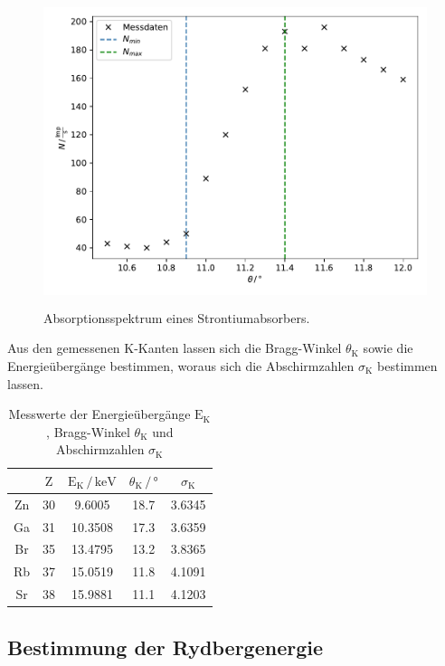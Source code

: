 \begin{figure}
    \centering
       \includegraphics[height=9cm]{daten/strontium.pdf}
       \caption{Absorptionsspektrum eines Strontiumabsorbers.}
       \label{fig:strontium}
\end{figure}

\noindent
Aus den gemessenen K-Kanten lassen sich die Bragg-Winkel $\theta_\text{K}$ sowie die Energieübergänge bestimmen,
woraus sich die Abschirmzahlen $\sigma_\text{K}$ bestimmen lassen.

\begin{table}
    \centering
    \caption{Messwerte der Energieübergänge $\text{E}_\text{K}$, Bragg-Winkel $\theta_\text{K}$ und Abschirmzahlen $\sigma_\text{K}$}
    \label{tab:mess3}
    \begin{tabular}{c c c c c}
    \toprule
         & $\text{Z}$ & $\text{E}_\text{K} \,/\, \mathrm{keV}$ & $\theta_\text{K} \,/\, ° $ & $\sigma_\text{K} $\\
    \midrule 
      Zn & 30 & 9.6005  & 18.7 & 3.6345 \\
      Ga & 31 & 10.3508 & 17.3 & 3.6359 \\
      Br & 35 & 13.4795 & 13.2 & 3.8365 \\
      Rb & 37 & 15.0519 & 11.8 & 4.1091 \\
      Sr & 38 & 15.9881 & 11.1 & 4.1203 \\
    \bottomrule
    \end{tabular}
    \end{table}

\subsection{Bestimmung der Rydbergenergie}    


